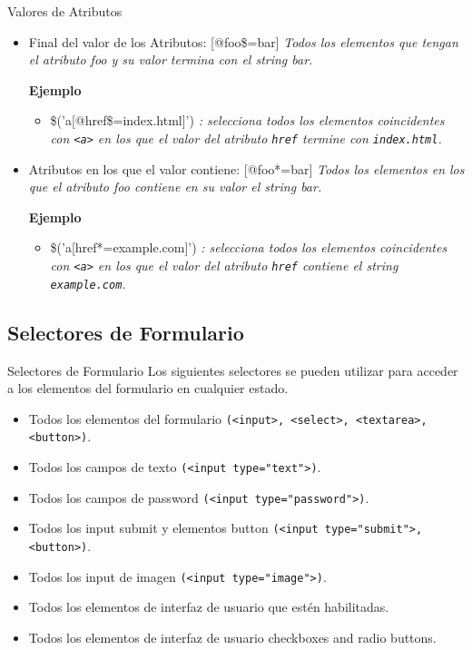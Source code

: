 \begin{frame}[fragile]{Valores de Atributos} %
\begin{itemize}
\item Final del valor de los Atributos: [@foo\$=bar] \textit{Todos los elementos
que tengan el atributo foo y su valor termina con el string bar.}
    
    \textbf{Ejemplo}
    \begin{itemize}
        \item \$('a[@href\$=index.html]') \textit{: selecciona todos los elementos
    coincidentes con \texttt{<a>} en los que el valor del atributo
    \texttt{href} termine con \texttt{index.html}.}
    \end{itemize}

\item Atributos en los que el valor contiene: [@foo*=bar] \textit{Todos los
elementos en los que el atributo foo contiene en su valor el string bar.}
    
    \textbf{Ejemplo}
    \begin{itemize}
        \item \$('a[href*=example.com]') \textit{: selecciona todos los elementos
    coincidentes con \texttt{<a>} en los que el valor del atributo
    \texttt{href} contiene el string \texttt{example.com}.}
    \end{itemize}
\end{itemize}
\end{frame}

\subsection{Selectores de Formulario} %

\begin{frame}[fragile]{Selectores de Formulario} %
Los siguientes selectores se pueden utilizar para acceder a los elementos del
formulario en cualquier estado.
\begin{itemize}
        \item Todos los elementos del formulario \texttt{(<input>, <select>,
        <textarea>, <button>)}.
        \item Todos los campos de texto \texttt{(<input type="text"\/>)}.
        \item Todos los campos de password \texttt{(<input type="password"\/>)}.
        \item Todos los input submit y elementos button \texttt{(<input
        type="submit"\/>, <button>)}.
        \item Todos los input de imagen \texttt{(<input type="image"\/>)}.
        \item Todos los elementos de interfaz de usuario que estén habilitadas.
        \item Todos los elementos de interfaz de usuario checkboxes and radio
        buttons.
\end{itemize}
\end{frame}


